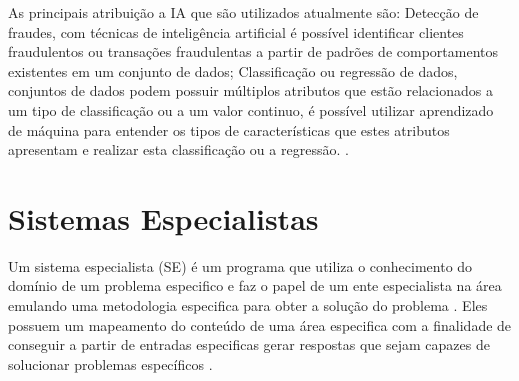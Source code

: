 \documentclass[
12pt,				%
oneside,			%
a4paper,			%
english,			%
french,				%
spanish,			%
brazil				%
]{abntex2}
\begin{document}



As principais atribuição a IA que são utilizados atualmente são: Detecção de fraudes, com técnicas de inteligência artificial é possível identificar clientes fraudulentos ou transações fraudulentas a partir de padrões de comportamentos existentes em um conjunto de dados; Classificação ou regressão de dados, conjuntos de dados podem possuir múltiplos atributos que estão relacionados a um tipo de classificação ou a um valor continuo, é possível utilizar aprendizado de máquina para entender os tipos de características que estes atributos apresentam e realizar esta classificação ou a regressão.  \cite{faceli2011inteligencia}.



\section{Sistemas Especialistas}

Um sistema especialista (SE) é um programa que utiliza o conhecimento do domínio de um problema especifico e faz o papel de um ente especialista na área emulando uma metodologia especifica para obter a solução do problema \cite{giarratano1998expert}. Eles possuem um mapeamento do conteúdo de uma área especifica com a finalidade de conseguir a partir de entradas especificas gerar respostas que sejam capazes de solucionar problemas específicos \cite{de2014inteligencia}. 
\end{document}
